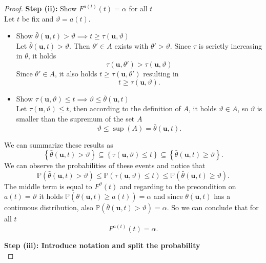 \begin{proof}
		
	\textbf{Step (ii):} Show $F^{a(t)} (t) = \alpha$ for all $t$ \\
	
	Let $t$ be fix and $\vartheta = a(t)$.
	\begin{itemize}
		\item 
		Show $\bar \theta (\mathbf u, t) > \vartheta \implies t \geq \tau (\mathbf u, \vartheta)$ \\
		Let $\bar \theta (\mathbf u, t) > \vartheta$. Then $\theta' \in A$ exists with $\theta' > \vartheta$. 
		Since $\tau$ is scrictly increasing in $\theta$, it holds 
		\[
		\tau (\mathbf u, \theta')
		>
		\tau (\mathbf u, \vartheta)
		\]
		Since $\theta' \in A$, it also holds $t \geq \tau (\mathbf u, \theta')$ resulting in 
		\[
		t \geq \tau (\mathbf u, \vartheta).
		\]
		\item 
		Show $\tau (\mathbf u, \vartheta) \leq t \implies \vartheta \leq \bar \theta (\mathbf u, t)$ \\
		Let $\tau (\mathbf u, \vartheta) \leq t$, then according to the definition of $A$, it holds $\vartheta \in A$, so $\vartheta$ is smaller than the supremum of the set $A$
		\[
		\vartheta \leq \sup(A) = \bar \theta (\mathbf u, t).
		\]
	\end{itemize}
	We can summarize these results as
	\[
	\left\{ 
	\bar \theta (\mathbf u, t) > \vartheta
	\right\}
	\subseteq
	\left\{ 
	\tau (\mathbf u, \vartheta) \leq t
	\right\}
	\subseteq
	\left\{ 
	\bar \theta (\mathbf u, t) \geq \vartheta
	\right\}.
	\]
	We can observe the probabilities of these events and notice that 
	\[
	\mathbb{P}
	\left(
	\bar \theta (\mathbf u, t) > \vartheta
	\right) 
	\leq
	\mathbb{P}
	\left(
	\tau (\mathbf u, \vartheta) \leq t
	\right) 
	\leq
	\mathbb{P}
	\left(
	\bar \theta (\mathbf u, t) \geq \vartheta
	\right) 
	.
	\]
	The middle term is equal to $F^{\vartheta}(t)$ and regarding to the precondition on $a(t) = \vartheta$ it holds 
	$\mathbb{P}
	\left(
	\bar \theta (\mathbf u, t) \geq a(t)
	\right) = \alpha$ and since $\bar \theta(\mathbf u, t)$ has a continuous distribution, also $\mathbb{P}
	\left(
	\bar \theta (\mathbf u, t) > \vartheta
	\right)  = \alpha$. So we can conclude that	for all $t$
	\[
	F^{a(t)} (t) 
	=
	\alpha .
	\]
	
	\textbf{Step (iii): Introduce notation and split the probability} \\
	

\end{proof}
